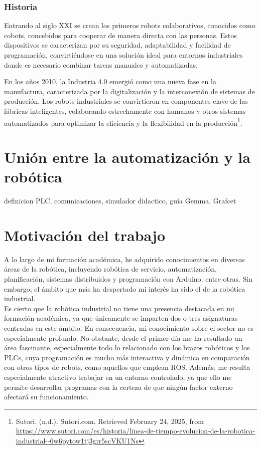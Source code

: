 \subsubsection{Historia}

Entrando al siglo XXI se crean los primeros robots colaborativos, conocidos como cobots, concebidos para cooperar de manera directa con las personas. Estos dispositivos se caracterizan por su seguridad, adaptabilidad y facilidad de programación, convirtiéndose en una solución ideal para entornos industriales donde es necesario combinar tareas manuales y automatizadas. 

En los años 2010, la Industria 4.0 emergió como una nueva fase en la manufactura, caracterizada por la digitalización y la interconexión de sistemas de producción.  Los robots industriales se convirtieron en componentes clave de las fábricas inteligentes, colaborando estrechamente con humanos y otros sistemas automatizados para optimizar la eficiencia y la flexibilidad en la producción\footnote{Sutori. (n.d.). Sutori.com. Retrieved February 24, 2025, from \url{ https://www.sutori.com/es/historia/linea-de-tiempo-evolucion-de-la-robotica-industrial--6w6pytow1tj3grr5scVKU1Ns}}. 

\section{Unión entre la automatización y la robótica}
\label{sec:terceraseccion}

definicion PLC, comunicaciones, simulador didactico, guía Gemma, Grafcet \\

\section{Motivación del trabajo}
\label{sec:cuartaseccion}

A lo largo de mi formación académica, he adquirido conocimientos en diversas áreas de la robótica, incluyendo robótica de servicio, automatización, planificación, sistemas distribuidos y programación con Arduino, entre otras. Sin embargo, el ámbito que más ha despertado mi interés ha sido el de la robótica industrial. \\

Es cierto que la robótica industrial no tiene una presencia destacada en mi formación académica, ya que únicamente se imparten dos o tres asignaturas centradas en este ámbito. En consecuencia, mi conocimiento sobre el sector no es especialmente profundo. No obstante, desde el primer día me ha resultado un área fascinante, especialmente todo lo relacionado con los brazos robóticos y los PLCs, cuya programación es mucho más interactiva y dinámica en comparación con otros tipos de robots, como aquellos que emplean ROS. Además, me resulta especialmente atractivo trabajar en un entorno controlado, ya que ello me permite desarrollar programas con la certeza de que ningún factor externo afectará su funcionamiento. \\

